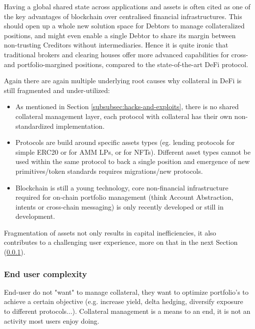 \documentclass[sigconf,nonacm]{acmart}
\begin{document}
Having a global shared state across applications and assets is often cited as one of the key advantages of blockchain over centralised financial infrastructures\cite{schar2021decentralized}.
This should open up a whole new solution space for Debtors to manage collateralized positions, 
and might even enable a single Debtor to share its margin between non-trusting Creditors without intermediaries.
Hence it is quite ironic that traditional brokers and clearing houses offer more advanced capabilities for cross- and portfolio-margined positions, compared to the state-of-the-art DeFi protocol.

Again there are again multiple underlying root causes why collateral in DeFi is still fragmented and under-utilized:
\begin{itemize}
    \item As mentioned in Section \ref{subsubsec:hacks-and-exploits}, there is no shared collateral management layer, each protocol with collateral has their own non-standardized implementation.
    \item Protocols are build around specific assets types (eg. lending protocols for simple ERC20 or for AMM LPs, or for NFTs). 
    Different asset types cannot be used within the same protocol to back a single position and emergence of new primitives/token standards requires migrations/new protocols.
    \item Blockchain is still a young technology, core non-financial infrastructure required for on-chain portfolio management (think Account Abstraction, intents or cross-chain messaging) is only recently developed or still in development. 
\end{itemize}

Fragmentation of assets not only results in capital inefficiencies, it also contributes to a challenging user experience, more on that in the next Section (\ref{subsubsec:end-user-complexity}).

\subsubsection{End user complexity}
\label{subsubsec:end-user-complexity}

End-user do not "want" to manage collateral, they want to optimize portfolio's to achieve a certain objective (e.g. increase yield, delta hedging, diversify exposure to different protocols...).
Collateral management is a means to an end, it is not an activity most users enjoy doing.
\end{document}
